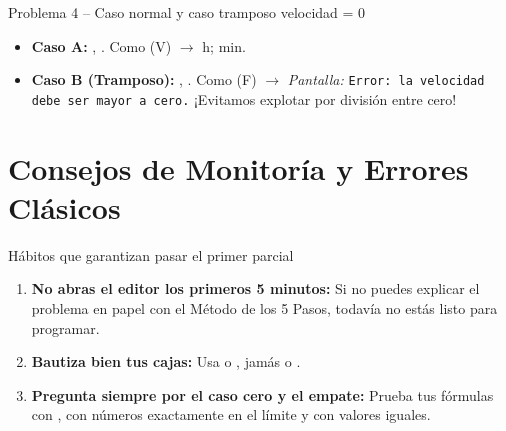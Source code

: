 \documentclass[11pt,letterpaper]{article}
\begin{document}
\begin{pruebaescritorio}{Problema 4 -- Caso normal y caso tramposo velocidad = 0}
\begin{itemize}
  \item \textbf{Caso A:} , . Como  (V) $\rightarrow$  h;  min.
  \item \textbf{Caso B (Tramposo):} , . Como  (F) $\rightarrow$ \textit{Pantalla:} \texttt{Error: la velocidad debe ser mayor a cero.} ¡Evitamos explotar por división entre cero!
\end{itemize}
\end{pruebaescritorio}

\section{Consejos de Monitoría y Errores Clásicos}

\begin{consejo}{Hábitos que garantizan pasar el primer parcial}
\begin{enumerate}
  \item \textbf{No abras el editor los primeros 5 minutos:} Si no puedes explicar el problema en papel con el Método de los 5 Pasos, todavía no estás listo para programar.
  \item \textbf{Bautiza bien tus cajas:} Usa  o , jamás  o .
  \item \textbf{Pregunta siempre por el caso cero y el empate:} Prueba tus fórmulas con , con números exactamente en el límite y con valores iguales.
\end{enumerate}
\end{consejo}
\end{document}
